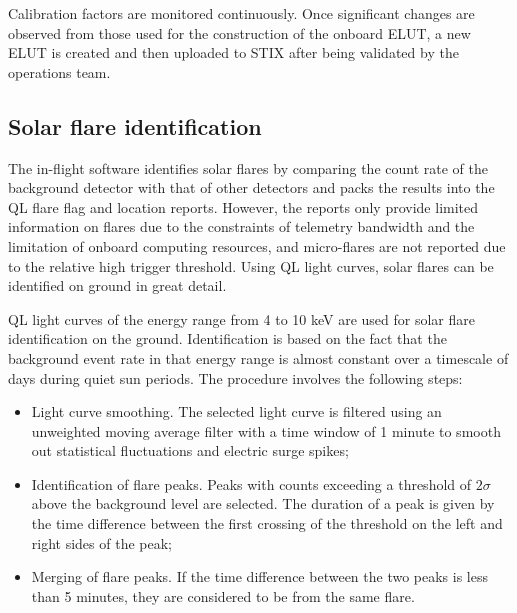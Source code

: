 \documentclass{aa}
\begin{document}
Calibration factors are monitored continuously. Once significant changes are 
observed from those used for the construction of  the onboard ELUT, 
 a new ELUT is  created and  then uploaded to STIX after being validated by the operations team. 

\subsection{Solar flare identification}
The in-flight software identifies solar flares by comparing  the count rate of 
the background detector with that of other detectors 
 and packs the results into the QL flare flag and location reports.
However,  the reports only provide limited information on flares due to the constraints of telemetry 
bandwidth and the limitation of onboard computing resources, and micro-flares are not 
reported due to the relative high trigger threshold.
Using QL light curves, solar flares can be identified on ground in great detail.

QL light curves of the energy range from  4 to 10 keV are used for solar flare identification
on the ground. Identification is based on the fact 
that the background event rate in that energy range is almost constant 
over a timescale of days during quiet sun periods. 
The procedure involves the following steps:
\begin{itemize}
  \item Light curve smoothing. The selected light curve is filtered using an unweighted
  moving average filter with a time window of 1 minute to smooth out statistical fluctuations and electric surge spikes;
  \item Identification of flare peaks. Peaks with counts exceeding a threshold of $2\sigma$ above the background level
   are selected. The duration of a peak is given by the time difference between the first 
   crossing of the threshold on the left and right sides of the peak;  
  \item Merging of flare peaks. If the time difference between the two peaks is less than 5 minutes,
   they are considered to be from the same flare.
\end{itemize}
\end{document}
